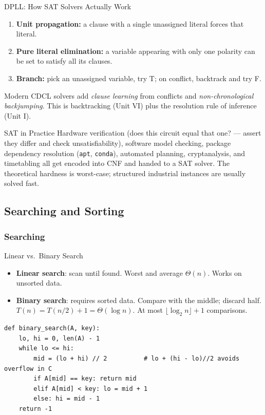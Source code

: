 \documentclass[11pt,a4paper]{article}
\begin{document}
\begin{formulabox}{DPLL: How SAT Solvers Actually Work}
\begin{enumerate}
    \item \textbf{Unit propagation:} a clause with a single unassigned literal forces that literal.
    \item \textbf{Pure literal elimination:} a variable appearing with only one polarity can be set to satisfy all its clauses.
    \item \textbf{Branch:} pick an unassigned variable, try T; on conflict, backtrack and try F.
\end{enumerate}
Modern CDCL solvers add \emph{clause learning} from conflicts and \emph{non-chronological backjumping}. This is backtracking (Unit VI) plus the resolution rule of inference (Unit I).
\end{formulabox}

\begin{usecase}{SAT in Practice}
Hardware verification (does this circuit equal that one? --- assert they differ and check unsatisfiability), software model checking, package dependency resolution (\texttt{apt}, \texttt{conda}), automated planning, cryptanalysis, and timetabling all get encoded into CNF and handed to a SAT solver. The theoretical hardness is worst-case; structured industrial instances are usually solved fast.
\end{usecase}

\subsection{Searching and Sorting}

\subsubsection{Searching}

\begin{keyconcept}{Linear vs.\ Binary Search}
\begin{itemize}
    \item \textbf{Linear search}: scan until found. Worst and average $\Theta(n)$. Works on unsorted data.
    \item \textbf{Binary search}: requires sorted data. Compare with the middle; discard half. $T(n) = T(n/2) + 1 = \Theta(\log n)$. At most $\lfloor \log_2 n\rfloor + 1$ comparisons.
\end{itemize}
\begin{lstlisting}
def binary_search(A, key):
    lo, hi = 0, len(A) - 1
    while lo <= hi:
        mid = (lo + hi) // 2          # lo + (hi - lo)//2 avoids overflow in C
        if A[mid] == key: return mid
        elif A[mid] < key: lo = mid + 1
        else: hi = mid - 1
    return -1
\end{lstlisting}
\end{keyconcept}
\end{document}
